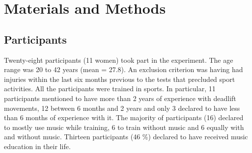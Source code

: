 \documentclass[10pt,letterpaper]{article}
\begin{document}
%



\section*{Materials and Methods} \label{sec:materials_methods}



\subsection*{Participants}
Twenty-eight participants (11 women) took part in the experiment. The age range was 20 to 42 years (mean = 27.8). An exclusion criterion was having had injuries within the last six months previous to the tests that precluded sport activities. 
All the participants were trained in sports. In particular, 11 participants mentioned to have more than 2 years of experience with deadlift movements, 12 between 6 months and 2 years and only 3 declared to have less than 6 months of experience with it.   
The majority of participants (16) declared to mostly use music while training, 6 to train without music and 6 equally  with and without music.
Thirteen participants (46 \%) declared to have received music education in their life.
\end{document}
